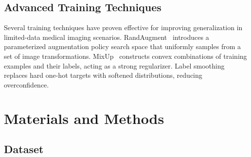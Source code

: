 \documentclass[10pt,twocolumn,letterpaper]{article}
\begin{document}
\begin{table}[h]
\small
\centering
\caption{External DogHeart comparison values reported by the RVT paper~\cite{li2024regressive}. Values are percentages under the cited paper's protocol and serve as literature baselines.}
\label{tab:rvt}
\end{table}

\subsection{Advanced Training Techniques}

Several training techniques have proven effective for improving generalization in limited-data medical imaging scenarios. RandAugment~\cite{randaugment2019} introduces a parameterized augmentation policy search space that uniformly samples from a set of image transformations. MixUp~\cite{mixup2018} constructs convex combinations of training examples and their labels, acting as a strong regularizer. Label smoothing~\cite{szegedy2016} replaces hard one-hot targets with softened distributions, reducing overconfidence.

\section{Materials and Methods}\label{sec:method}

\subsection{Dataset}
\end{document}
